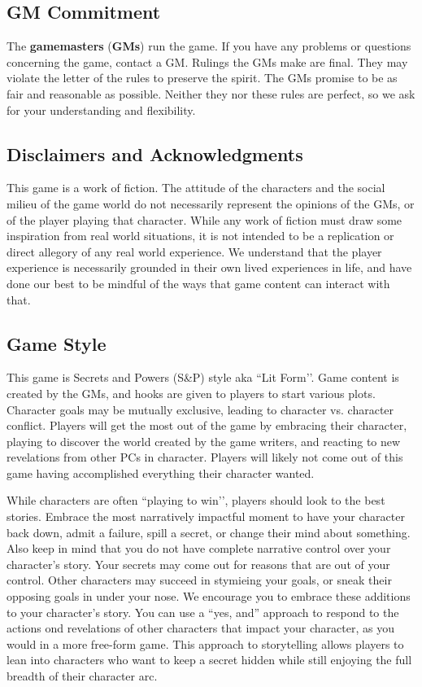 \documentclass[sheet]{GL2020}
\begin{document}
\subsection{GM Commitment}
The \textbf{gamemasters} (\textbf{GMs}) run the game. If you have any problems or questions concerning the game, contact a GM. Rulings the GMs make are final.  They may violate the letter of the rules to preserve the spirit.  The GMs promise to be as fair and reasonable as possible. Neither they nor these rules are perfect, so we ask for your understanding and flexibility.

\subsection{Disclaimers and Acknowledgments}
This game is a work of fiction. The attitude of the characters and the social milieu of the game world do not necessarily represent the opinions of the GMs, or of the player playing that character. While any work of fiction must draw some inspiration from real world situations, it is not intended to be a replication or direct allegory of any real world experience. We understand that the player experience is necessarily grounded in their own lived experiences in life, and have done our best to be mindful of the ways that game content can interact with that. %

\subsection{Game Style}
This game is Secrets and Powers (S\&P) style aka ``Lit Form’’. Game content is created by the GMs, and hooks are given to players to start various plots. Character goals may be mutually exclusive, leading to character vs. character conflict. Players will get the most out of the game by embracing their character, playing to discover the world created by the game writers, and reacting to new revelations from other PCs in character. Players will likely not come out of this game having accomplished everything their character wanted.

While characters are often ``playing to win’’, players should look to the best stories. Embrace the most narratively impactful moment to have your character back down, admit a failure, spill a secret, or change their mind about something. Also keep in mind that you do not have complete narrative control over your character’s story. Your secrets may come out for reasons that are out of your control. Other characters may succeed in stymieing your goals, or sneak their opposing goals in under your nose. We encourage you to embrace these additions to your character’s story. You can use a ``yes, and'' approach to respond to the actions ond revelations of other characters that impact your character, as you would in a more free-form game. This approach to storytelling allows players to lean into characters who want to keep a secret hidden while still enjoying the full breadth of their character arc.
\end{document}
